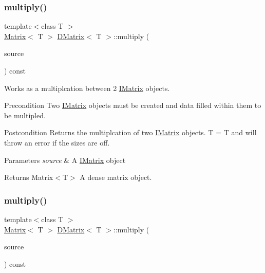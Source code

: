 \subsubsection{\texorpdfstring{multiply()}{multiply()}\hspace{0.1cm}{\footnotesize\ttfamily [4/6]}}
{\footnotesize\ttfamily template$<$class T $>$ \\
\mbox{\hyperlink{class_matrix}{Matrix}}$<$ T $>$ \mbox{\hyperlink{class_d_matrix}{D\+Matrix}}$<$ T $>$\+::multiply (\begin{DoxyParamCaption}\item[{const \mbox{\hyperlink{class_i_matrix}{I\+Matrix}}$<$ \mbox{\hyperlink{class_u_matrix}{U\+Matrix}}$<$ T $>$, T $>$ \&}]{source }\end{DoxyParamCaption}) const}



Works as a multiplcation between 2 \mbox{\hyperlink{class_i_matrix}{I\+Matrix}} objects. 

\begin{DoxyPrecond}{Precondition}
Two \mbox{\hyperlink{class_i_matrix}{I\+Matrix}} objects must be created and data filled within them to be multipled. 
\end{DoxyPrecond}
\begin{DoxyPostcond}{Postcondition}
Returns the multiplcation of two \mbox{\hyperlink{class_i_matrix}{I\+Matrix}} objects. T = T and will throw an error if the sizes are off.
\end{DoxyPostcond}

\begin{DoxyParams}{Parameters}
{\em source} & A \mbox{\hyperlink{class_i_matrix}{I\+Matrix}} object \\
\hline
\end{DoxyParams}
\begin{DoxyReturn}{Returns}
Matrix$<$\+T$>$ A dense matrix object. 
\end{DoxyReturn}
\mbox{\label{class_d_matrix_afe62da0990506ed0f45d274b24f37a00}} 
\subsubsection{\texorpdfstring{multiply()}{multiply()}\hspace{0.1cm}{\footnotesize\ttfamily [5/6]}}
{\footnotesize\ttfamily template$<$class T $>$ \\
\mbox{\hyperlink{class_matrix}{Matrix}}$<$ T $>$ \mbox{\hyperlink{class_d_matrix}{D\+Matrix}}$<$ T $>$\+::multiply (\begin{DoxyParamCaption}\item[{const \mbox{\hyperlink{class_i_matrix}{I\+Matrix}}$<$ \mbox{\hyperlink{class_s_matrix}{S\+Matrix}}$<$ T $>$, T $>$ \&}]{source }\end{DoxyParamCaption}) const}



